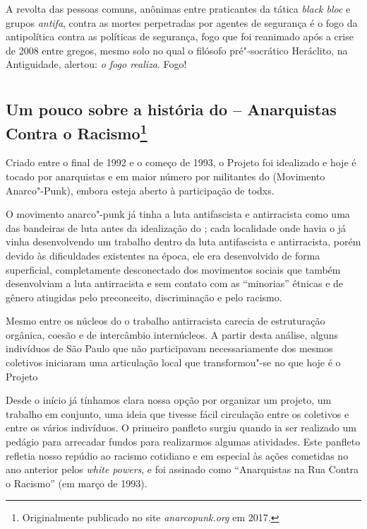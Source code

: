 A revolta das pessoas comuns, anônimas entre praticantes da tática
\emph{black bloc} e grupos \emph{antifa}, contra as mortes perpetradas
por agentes de segurança é o fogo da antipolítica contra as políticas de
segurança, fogo que foi reanimado após a crise de 2008 entre gregos,
mesmo solo no qual o filósofo pré"-socrático Heráclito, na Antiguidade,
alertou: \emph{o fogo realiza}. Fogo!


\part{}

\chapter{Um pouco sobre a história do  -- Anarquistas Contra o Racismo\footnote[*]{Originalmente publicado no site \emph{anarcopunk.org} em 2017.}}
\label{acr}

Criado entre o final de 1992 e o começo de 1993, o Projeto  foi idealizado e hoje é tocado por anarquistas e em maior número por militantes do  (Movimento Anarco"-Punk), embora esteja aberto à participação de todxs.

O movimento anarco"-punk já tinha a luta antifascista e antirracista como uma das bandeiras de luta antes da idealização do ; cada localidade onde havia o  já vinha desenvolvendo um trabalho dentro da luta antifascista e antirracista, porém devido às dificuldades existentes na época, ele era desenvolvido de forma superficial, completamente desconectado dos movimentos sociais que também desenvolviam a luta antirracista e sem contato com as ``minorias'' étnicas e de gênero atingidas pelo preconceito, discriminação e pelo racismo.

Mesmo entre os núcleos do  o trabalho antirracista carecia de estruturação orgânica, coesão e de intercâmbio internúcleos. A partir desta análise, alguns indivíduos de São Paulo que não participavam necessariamente dos mesmos coletivos iniciaram uma articulação local que transformou"-se no que hoje é o Projeto 

Desde o início já tínhamos clara nossa opção por organizar um projeto, um trabalho em conjunto, uma ideia que tivesse fácil circulação entre os coletivos e entre os vários indivíduos. O primeiro panfleto surgiu quando ia ser realizado um pedágio para arrecadar fundos para realizarmos algumas atividades. Este panfleto refletia nosso repúdio ao racismo cotidiano e em especial às ações cometidas no ano anterior pelos \emph{white powers}, e foi assinado como ``Anarquistas na Rua Contra o Racismo'' (em março de 1993).

